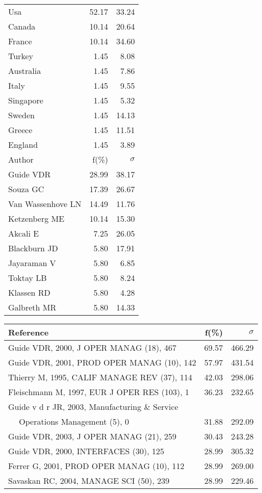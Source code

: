 \documentclass[a4paper,11pt]{report}
\begin{document}
\begin{landscape}
\begin{table}[!ht]
{\begin{tabular}{|l r r|}
\hline
Usa & 52.17 & 33.24\\
Canada & 10.14 & 20.64\\
France & 10.14 & 34.60\\
Turkey & 1.45 & 8.08\\
Australia & 1.45 & 7.86\\
Italy & 1.45 & 9.55\\
Singapore & 1.45 & 5.32\\
Sweden & 1.45 & 14.13\\
Greece & 1.45 & 11.51\\
England & 1.45 & 3.89\\
\hline
\hline
Author & f(\%) & $\sigma$\\
\hline
Guide VDR & 28.99 & 38.17\\
Souza GC & 17.39 & 26.67\\
Van Wassenhove LN & 14.49 & 11.76\\
Ketzenberg ME & 10.14 & 15.30\\
Akcali E & 7.25 & 26.05\\
Blackburn JD & 5.80 & 17.91\\
Jayaraman V & 5.80 & 6.85\\
Toktay LB & 5.80 & 8.24\\
Klassen RD & 5.80 & 4.28\\
Galbreth MR & 5.80 & 14.33\\
\hline
\end{tabular}
}
{\scriptsize\begin{tabular}{|l r r|}
\hline
Reference & f(\%) & $\sigma$\\
\hline
Guide VDR, 2000, J OPER MANAG (18), 467 & 69.57 & 466.29\\
Guide VDR, 2001, PROD OPER MANAG (10), 142 & 57.97 & 431.54\\
Thierry M, 1995, CALIF MANAGE REV (37), 114 & 42.03 & 298.06\\
Fleischmann M, 1997, EUR J OPER RES (103), 1 & 36.23 & 232.65\\
Guide v d r  JR, 2003, Manufacturing \& Service &  & \\
$\quad$ Operations Management (5), 0 & 31.88 & 292.09\\
Guide VDR, 2003, J OPER MANAG (21), 259 & 30.43 & 243.28\\
Guide VDR, 2000, INTERFACES (30), 125 & 28.99 & 305.32\\
Ferrer G, 2001, PROD OPER MANAG (10), 112 & 28.99 & 269.00\\
Savaskan RC, 2004, MANAGE SCI (50), 239 & 28.99 & 229.46\\

\end{tabular}}
\end{table}
\end{landscape}
\end{document}
